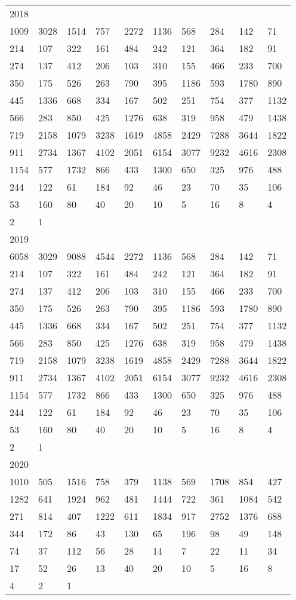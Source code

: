 \begin{longtable}{*{10}{l}}
2018&&&&&&&&&\\
1009& 3028& 1514& 757& 2272& 1136& 568& 284& 142& 71\\
214& 107& 322& 161& 484& 242& 121& 364& 182& 91\\
274& 137& 412& 206& 103& 310& 155& 466& 233& 700\\
350& 175& 526& 263& 790& 395& 1186& 593& 1780& 890\\
445& 1336& 668& 334& 167& 502& 251& 754& 377& 1132\\
566& 283& 850& 425& 1276& 638& 319& 958& 479& 1438\\
719& 2158& 1079& 3238& 1619& 4858& 2429& 7288& 3644& 1822\\
911& 2734& 1367& 4102& 2051& 6154& 3077& 9232& 4616& 2308\\
1154& 577& 1732& 866& 433& 1300& 650& 325& 976& 488\\
244& 122& 61& 184& 92& 46& 23& 70& 35& 106\\
53& 160& 80& 40& 20& 10& 5& 16& 8& 4\\
2& 1& \\

2019&&&&&&&&&\\
6058& 3029& 9088& 4544& 2272& 1136& 568& 284& 142& 71\\
214& 107& 322& 161& 484& 242& 121& 364& 182& 91\\
274& 137& 412& 206& 103& 310& 155& 466& 233& 700\\
350& 175& 526& 263& 790& 395& 1186& 593& 1780& 890\\
445& 1336& 668& 334& 167& 502& 251& 754& 377& 1132\\
566& 283& 850& 425& 1276& 638& 319& 958& 479& 1438\\
719& 2158& 1079& 3238& 1619& 4858& 2429& 7288& 3644& 1822\\
911& 2734& 1367& 4102& 2051& 6154& 3077& 9232& 4616& 2308\\
1154& 577& 1732& 866& 433& 1300& 650& 325& 976& 488\\
244& 122& 61& 184& 92& 46& 23& 70& 35& 106\\
53& 160& 80& 40& 20& 10& 5& 16& 8& 4\\
2& 1& \\

2020&&&&&&&&&\\
1010& 505& 1516& 758& 379& 1138& 569& 1708& 854& 427\\
1282& 641& 1924& 962& 481& 1444& 722& 361& 1084& 542\\
271& 814& 407& 1222& 611& 1834& 917& 2752& 1376& 688\\
344& 172& 86& 43& 130& 65& 196& 98& 49& 148\\
74& 37& 112& 56& 28& 14& 7& 22& 11& 34\\
17& 52& 26& 13& 40& 20& 10& 5& 16& 8\\
4& 2& 1& \\


\end{longtable}
